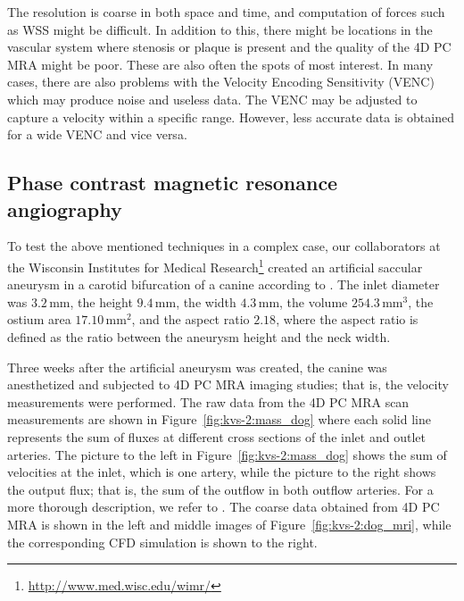 The resolution is coarse in both space and time, and computation of
forces such as WSS might be difficult. In addition to this, there
might be locations in the vascular system where stenosis or plaque is
present and the quality of the 4D PC MRA might be poor. These are also
often the spots of most interest. In many cases, there are also
problems with the Velocity Encoding Sensitivity (VENC) which may
produce noise and useless data. The VENC may be adjusted to capture a
velocity within a specific range. However, less accurate data is
obtained for a wide VENC and vice versa.

\subsection{Phase contrast magnetic resonance angiography}

To test the above mentioned techniques in a complex case, our
collaborators at the Wisconsin Institutes for Medical
Research\footnote{\url{http://www.med.wisc.edu/wimr/}} created an
artificial saccular aneurysm in a carotid bifurcation of a canine
according to \citet{GermanBlack1965}. The inlet diameter was
$3.2\,\mathrm{mm}$, the height $9.4\,\mathrm{mm}$, the width
$4.3\,\mathrm{mm}$, the volume $254.3\,\mathrm{mm}^3$, the ostium area
$17.10\,\mathrm{mm}^2$, and the aspect ratio $2.18$, where the aspect
ratio is defined as the ratio between the aneurysm height and the neck
width.

Three weeks after the artificial aneurysm was created, the canine was
anesthetized and subjected to 4D PC MRA imaging studies; that is, the
velocity measurements were performed. The raw data from the 4D PC MRA
scan measurements are shown in Figure~\ref{fig:kvs-2:mass_dog} where
each solid line represents the sum of fluxes at different cross
sections of the inlet and outlet arteries. The picture to the left in
Figure~\ref{fig:kvs-2:mass_dog} shows the sum of velocities at the
inlet, which is one artery, while the picture to the right shows the
output flux; that is, the sum of the outflow in both outflow
arteries. For a more thorough description, we refer
to \citet{JiangJohnsonValen-SendstadEtAl2010}.  The coarse data
obtained from 4D PC MRA is shown in the left and middle images of
Figure~\ref{fig:kvs-2:dog_mri}, while the corresponding CFD simulation
is shown to the right.

